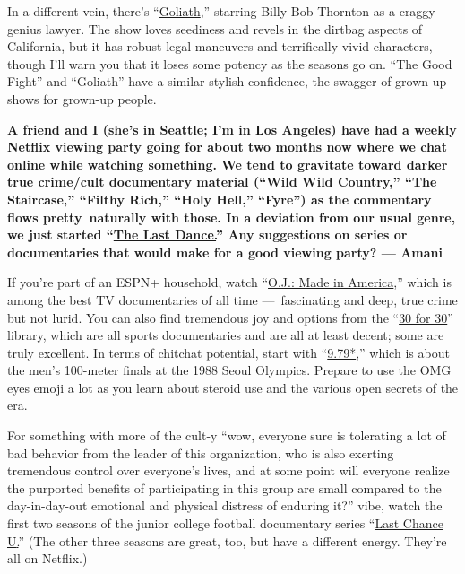 In a different vein, there's
``\href{https://www.nytimes3xbfgragh.onion/2016/10/14/arts/television/review-in-goliath-billy-bob-thornton-plays-a-down-and-out-david.html}{Goliath},''
starring Billy Bob Thornton as a craggy genius lawyer. The show loves
seediness and revels in the dirtbag aspects of California, but it has
robust legal maneuvers and terrifically vivid characters, though I'll
warn you that it loses some potency as the seasons go on. ``The Good
Fight'' and ``Goliath'' have a similar stylish confidence, the swagger
of grown-up shows for grown-up people.

\textbf{A friend and I (she's in Seattle; I'm in Los Angeles) have had a
weekly Netflix viewing party going for about two months now where we
chat online while watching something. We tend to gravitate toward darker
true crime/cult documentary material (``Wild Wild Country,'' ``The
Staircase,'' ``Filthy Rich,'' ``Holy Hell,'' ``Fyre'') as the commentary
flows pretty~naturally with those. In a deviation from our usual genre,
we just started ``\href{https://www.netflix.com/title/80203144}{The Last
Dance.}'' Any suggestions on series or documentaries that would make for
a good viewing party? --- Amani}

If you're part of an ESPN+ household, watch
``\href{http://www.espn.com/30for30/ojsimpsonmadeinamerica/}{O.J.: Made
in America},'' which is among the best TV documentaries of all time
---~fascinating and deep, true crime but not lurid. You can also find
tremendous joy and options from the
``\href{https://www.espn.com/espnplus/series/0514c1ad-efd1-4d3a-ad82-41ca579a94a2/30-for-30}{30
for 30}'' library, which are all sports documentaries and are all at
least decent; some are truly excellent. In terms of chitchat potential,
start with
``\href{http://www.espn.com/30for30/film/_/page/9.79}{9.79*},'' which is
about the men's 100-meter finals at the 1988 Seoul Olympics. Prepare to
use the OMG eyes emoji a lot as you learn about steroid use and the
various open secrets of the era.

For something with more of the cult-y ``wow, everyone sure is tolerating
a lot of bad behavior from the leader of this organization, who is also
exerting tremendous control over everyone's lives, and at some point
will everyone realize the purported benefits of participating in this
group are small compared to the day-in-day-out emotional and physical
distress of enduring it?'' vibe, watch the first two seasons of the
junior college football documentary series
``\href{https://www.netflix.com/title/80091742}{Last Chance
U}\href{https://www.nytimes3xbfgragh.onion/2020/07/28/arts/television/last-chance-u-season-5.html}{.}''
(The other three seasons are great, too, but have a different energy.
They're all on Netflix.)

